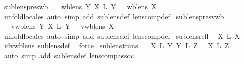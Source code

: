 \begin{isabellebody}
\isanewline
{}\isamarkupfalse%
\ sublens{\isacharunderscore}pres{\isacharunderscore}wb{\isacharcolon}\isanewline
\ \ {\isachardoublequoteopen}{\isasymlbrakk}\ wb{\isacharunderscore}lens\ Y{\isacharsemicolon}\ X\ {\isasymsubseteq}\isactrlsub L\ Y\ {\isasymrbrakk}\ {\isasymLongrightarrow}\ wb{\isacharunderscore}lens\ X{\isachardoublequoteclose}\isanewline
%
\isadelimproof
\ \ %
\endisadelimproof
%
\isatagproof
{}\isamarkupfalse%
\ {\isacharparenleft}unfold{\isacharunderscore}locales{\isacharcomma}\ auto\ simp\ add{\isacharcolon}\ sublens{\isacharunderscore}def\ lens{\isacharunderscore}comp{\isacharunderscore}def{\isacharparenright}%
\endisatagproof
{\isafoldproof}%
%
\isadelimproof
\isanewline
%
\endisadelimproof
\isanewline
{}\isamarkupfalse%
\ sublens{\isacharunderscore}pres{\isacharunderscore}vwb{\isacharcolon}\isanewline
\ \ {\isachardoublequoteopen}{\isasymlbrakk}\ vwb{\isacharunderscore}lens\ Y{\isacharsemicolon}\ X\ {\isasymsubseteq}\isactrlsub L\ Y\ {\isasymrbrakk}\ {\isasymLongrightarrow}\ vwb{\isacharunderscore}lens\ X{\isachardoublequoteclose}\isanewline
%
\isadelimproof
\ \ %
\endisadelimproof
%
\isatagproof
{}\isamarkupfalse%
\ {\isacharparenleft}unfold{\isacharunderscore}locales{\isacharcomma}\ auto\ simp\ add{\isacharcolon}\ sublens{\isacharunderscore}def\ lens{\isacharunderscore}comp{\isacharunderscore}def{\isacharparenright}%
\endisatagproof
{\isafoldproof}%
%
\isadelimproof
\isanewline
%
\endisadelimproof
\isanewline
{}\isamarkupfalse%
\ sublens{\isacharunderscore}refl{\isacharcolon}\isanewline
\ \ {\isachardoublequoteopen}X\ {\isasymsubseteq}\isactrlsub L\ X{\isachardoublequoteclose}\isanewline
%
\isadelimproof
\ \ %
\endisadelimproof
%
\isatagproof
{}\isamarkupfalse%
\ id{\isacharunderscore}vwb{\isacharunderscore}lens\ sublens{\isacharunderscore}def\ \isamarkupfalse%
\ force%
\endisatagproof
{\isafoldproof}%
%
\isadelimproof
\isanewline
%
\endisadelimproof
\isanewline
{}\isamarkupfalse%
\ sublens{\isacharunderscore}trans{\isacharcolon}\isanewline
\ \ {\isachardoublequoteopen}{\isasymlbrakk}\ X\ {\isasymsubseteq}\isactrlsub L\ Y{\isacharsemicolon}\ Y\ {\isasymsubseteq}\isactrlsub L\ Z\ {\isasymrbrakk}\ {\isasymLongrightarrow}\ X\ {\isasymsubseteq}\isactrlsub L\ Z{\isachardoublequoteclose}\isanewline
%
\isadelimproof
\ \ %
\endisadelimproof
%
\isatagproof
{}\isamarkupfalse%
\ {\isacharparenleft}auto\ simp\ add{\isacharcolon}\ sublens{\isacharunderscore}def\ lens{\isacharunderscore}comp{\isacharunderscore}assoc{\isacharparenright}\isanewline

\end{isabellebody}
